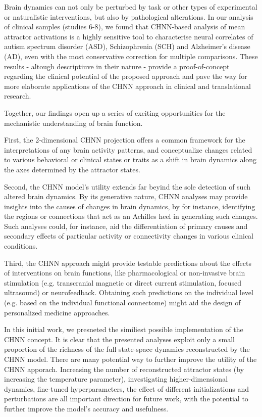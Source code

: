 \documentclass{article}
\begin{document}
Brain dynamics can not only be perturbed by task or other types of experimental or naturalistic interventions, but also
by pathological alterations. In our analysis of clinical samples (studies 6-8), we found that CHNN-based analysis of mean attractor activations is a highly sensitive tool to characterise neural correlates of autism spectrum disorder (ASD), Schizophrenia (SCH) and Alzheimer's disease (AD), even with the most conservative correction for multiple comparisons. These results - altough descriptiuve in their nature - provide a proof-of-concept regarding the clinical potential of the proposed approach and pave the way for more elaborate applications of the CHNN approach in clinical and translational research.

Together, our findings open up a series of exciting opportunities for the mechanistic understanding of brain function.

First, the 2-dimensional CHNN projection offers a common framework for the interpretations of any brain activity patterns, and conceptualize changes related to various behavioral or clinical states or traits as a shift in brain dynamics along the axes determined by the attractor states.

Second, the CHNN model's utility extends far beyind the sole detection of such altered brain dynamics. By its generative nature, CHNN analyses may provide insights into the causes of changes in brain dynamics, by for instance, identifying the regions or connections that act as an Achilles heel in generating such changes. Such analyses could, for instance, aid the differentiation of primary causes and secondary effects of particular activity or connectivity changes in various clinical conditions.

Third, the CHNN approach might provide testable predictions about the effects of interventions on brain functions,
like pharmacological or non-invasive brain stimulation (e.g. transcranial magnetic or direct current stimulation,
focused ultrasound) or neurofeedback. Obtaining such predictions on the individual level (e.g. based on the individual functional connectome) might aid the design of personalized medicine approaches.

In this initial work, we presneted the similiest possible implementation of the CHNN concept. It is clear that the presented analyses   exploit only a small proportion of the richness of the full state-space dynamics reconstructed by the CHNN model.
There are many potential way to further improve the utility of the CHNN apporach. Increasing the number of reconstructed attractor states (by increasing the temperature parameter), investigating higher-dimensional dynamics, fine-tuned hyperparameters, the effect of
different initializations and perturbations are all important direction for future work, with the potential to further
improve the model's accuracy and usefulness.
\end{document}
